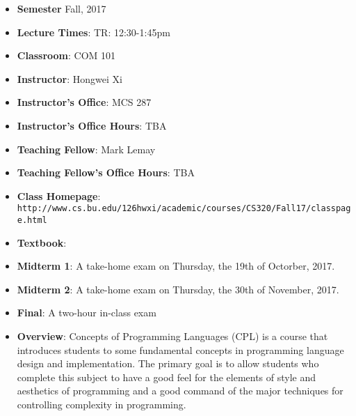 \documentclass[11pt]{article}
\begin{document}
\begin{itemize}
\item {\bf Semester} Fall, 2017

\item {\bf Lecture Times}: TR: 12:30-1:45pm

\item {\bf Classroom}: COM 101

\item {\bf Instructor}: Hongwei Xi
\item {\bf Instructor's Office}: MCS 287
\item {\bf Instructor's Office Hours}: TBA

\item {\bf Teaching Fellow}: Mark Lemay
\item {\bf Teaching Fellow's Office Hours}: TBA

\item {\bf Class Homepage}:\\
\texttt{http://www.cs.bu.edu/\char126hwxi/academic/courses/CS320/Fall17/classpage.html}

\item {\bf Textbook}:\kern6pt

\item
{\bf Midterm 1}\kern6pt:
A take-home exam on Thursday, the 19th of Octorber, 2017.

\item
{\bf Midterm 2}\kern6pt:
A take-home exam on Thursday, the 30th of November, 2017.

\item {\bf Final}:\kern6pt A two-hour in-class exam

\item {\bf Overview}:
Concepts of Programming Languages (CPL) is a course that introduces
students to some fundamental concepts in programming language design and
implementation. The primary goal is to allow students who complete this
subject to have a good feel for the elements of style and aesthetics of
programming and a good command of the major techniques for controlling
complexity in programming.


\end{itemize}
\end{document}
